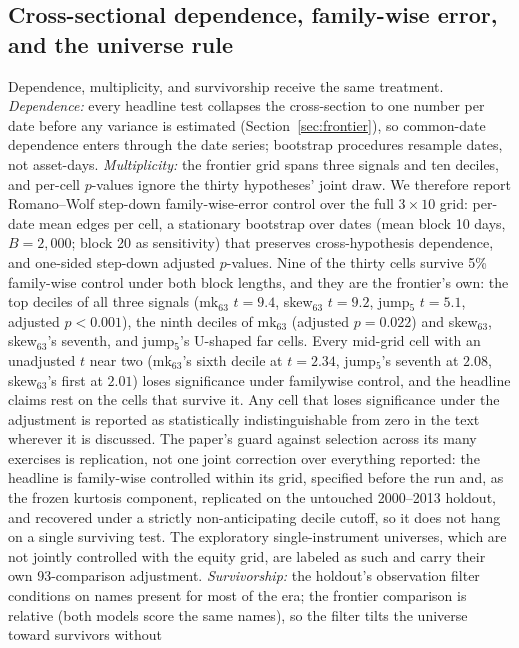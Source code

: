 \documentclass[11pt]{article}
\theoremstyle{remark}
\begin{document}
\subsection{Cross-sectional dependence, family-wise error, and the
universe rule}
\label{sec:fwer}

Dependence, multiplicity, and survivorship receive the same
treatment. \emph{Dependence:} every headline test collapses the cross-section
to one number per date before any variance is estimated
(Section~\ref{sec:frontier}), so common-date dependence enters
through the date series; bootstrap procedures resample dates, not
asset-days. \emph{Multiplicity:} the frontier grid spans three
signals and ten deciles, and per-cell $p$-values ignore the thirty
hypotheses' joint draw. We therefore report Romano--Wolf step-down
family-wise-error control over the full $3\times10$ grid: per-date
mean edges per cell, a stationary bootstrap over dates (mean block 10
days, $B=2{,}000$; block 20 as sensitivity) that preserves
cross-hypothesis dependence, and one-sided step-down adjusted
$p$-values.
Nine of the thirty cells survive 5\% family-wise control under both
block lengths, and they are the frontier's own: the top deciles of
all three signals (mk$_{63}$ $t=9.4$, skew$_{63}$ $t=9.2$, jump$_5$
$t=5.1$, adjusted $p<0.001$), the ninth deciles of mk$_{63}$
(adjusted $p=0.022$) and skew$_{63}$, skew$_{63}$'s seventh, and
jump$_5$'s U-shaped far cells. Every mid-grid cell with an unadjusted
$t$ near two (mk$_{63}$'s sixth decile at $t=2.34$, jump$_5$'s
seventh at $2.08$, skew$_{63}$'s first at $2.01$) loses
significance under familywise control, and the headline claims rest on
the cells that survive it. Any cell that loses significance under the
adjustment is reported as statistically indistinguishable from zero in
the text
wherever it is discussed. The paper's guard against selection across
its many exercises is replication, not one joint correction over
everything reported: the headline is family-wise controlled within its
grid, specified before the run and, as the frozen kurtosis component,
replicated on the untouched 2000--2013 holdout, and recovered under a strictly
non-anticipating decile cutoff, so it
does not hang on a single surviving test. The exploratory
single-instrument universes, which are not jointly controlled with the
equity grid, are labeled as such and carry their own 93-comparison
adjustment. \emph{Survivorship:} the holdout's
observation filter conditions on names present for most of the era;
the frontier comparison is relative (both models score the same
names), so the filter tilts the universe toward survivors without
\end{document}
